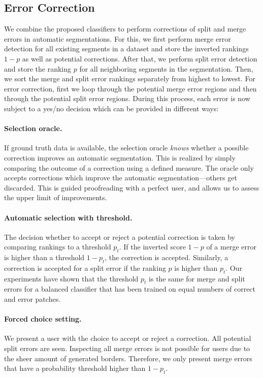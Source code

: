\subsection{Error Correction}
\label{sec:errorcorrection}

We combine the proposed classifiers to perform corrections of split and merge errors in automatic segmentations. For this, we first perform merge error detection for all existing segments in a dataset and store the inverted rankings $1-p$ as well as potential corrections. After that, we perform split error detection and store the ranking $p$ for all neighboring segments in the segmentation. Then, we sort the merge and split error rankings separately from highest to lowest. For error correction, first we loop through the potential merge error regions and then through the potential split error regions. During this process, each error is now subject to a yes/no decision which can be provided in different ways:

\paragraph{Selection oracle.} If ground truth data is available, the selection oracle \textit{knows} whether a possible correction improves an automatic segmentation. This is realized by simply comparing the outcome of a correction using a defined measure. The oracle only accepts corrections which improve the automatic segmentation---others get
discarded. This is guided proofreading with a perfect user, and allows us to assess the upper limit of improvements.

\paragraph{Automatic selection with threshold.} The decision whether to accept or reject a potential correction is taken by comparing rankings to a threshold $p_t$. If the inverted score $1-p$ of a merge error is higher than a threshold $1-p_t$, the correction is accepted. Similarly, a correction is accepted for a split error if the ranking $p$ is higher than $p_t$. Our experiments have shown that the threshold $p_t$ is the same for merge and split errors for a balanced classifier that has been trained on equal numbers of correct and error patches.

\paragraph{Forced choice setting.} We present a user with the choice to accept or reject a correction. All potential split errors are seen. Inspecting all merge errors is not possible for users due to the sheer amount of generated borders. Therefore, we only present merge errors that have a probability threshold higher than $1-p_t$.

